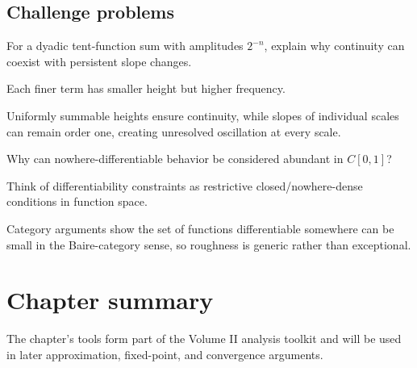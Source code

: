 \subsection*{Challenge problems}

\begin{exercise}\label{exr:ii15-expand-15}
For a dyadic tent-function sum with amplitudes \(2^{-n}\), explain why continuity can coexist with persistent slope changes.
\end{exercise}
\begin{hint}
Each finer term has smaller height but higher frequency.
\end{hint}
\begin{solution}
Uniformly summable heights ensure continuity, while slopes of individual scales can remain order one, creating unresolved oscillation at every scale.
\end{solution}

\begin{exercise}\label{exr:ii15-expand-16}
Why can nowhere-differentiable behavior be considered abundant in \(C[0,1]\)?
\end{exercise}
\begin{hint}
Think of differentiability constraints as restrictive closed/nowhere-dense conditions in function space.
\end{hint}
\begin{solution}
Category arguments show the set of functions differentiable somewhere can be small in the Baire-category sense, so roughness is generic rather than exceptional.
\end{solution}
\section*{Chapter summary}
The chapter's tools form part of the Volume II analysis toolkit and will be used in later approximation, fixed-point, and convergence arguments.
